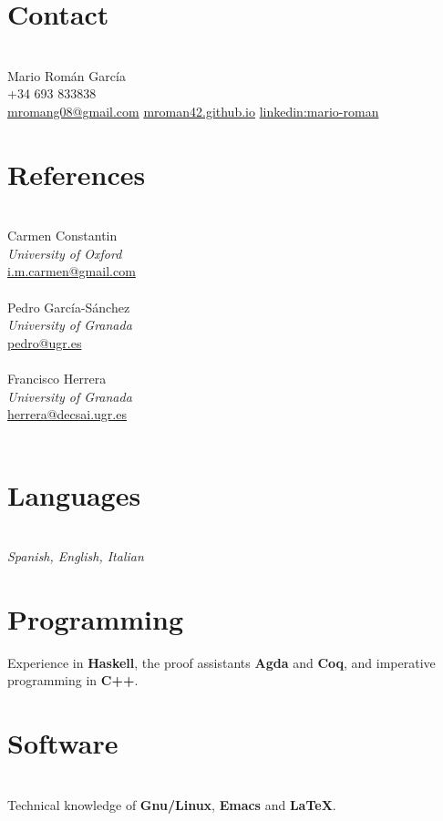 \documentclass[nocolors]{friggeri-cv-a4}
\begin{document}

\begin{aside} %
  \section{Contact}\\
  Mario Román García\\
+34 693 833838\\
\href{mailto:mromang08@gmail.com}{mromang08@gmail.com}
\href{https://mroman42.github.io}{mroman42.github.io}
\href{https://www.linkedin.com/in/mario-roman}{linkedin:mario-roman}
\section{References}\\
Carmen Constantin\\
\textit{University of Oxford}\\
\href{mailto:i.m.carmen@gmail.com}{i.m.carmen@gmail.com}\\
\quad\\
Pedro García-Sánchez\\
\textit{University of Granada}\\
\href{mailto:pedro@ugr.es}{pedro@ugr.es}\\
\quad\\
Francisco Herrera\\
\textit{University of Granada}\\
\href{mailto:herrera@decsai.ugr.es}{herrera@decsai.ugr.es}\\
\quad\\



\section{Languages}\\
\textit{Spanish,
English,
Italian}
\section{Programming}
{\small Experience in \textbf{Haskell},
  the proof assistants \textbf{Agda} and \textbf{Coq},
  and imperative programming in \textbf{C++}.
}

\section{Software}\\
{\small Technical knowledge of \textbf{Gnu/Linux},
  \textbf{Emacs} and \textbf{LaTeX}.
}
\end{aside}
\end{document}
